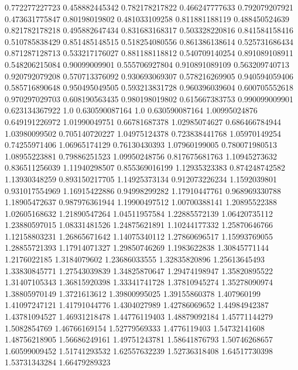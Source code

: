  0.772277227723   0.458882445342
 0.782178217822   0.466247777633
 0.792079207921   0.473631775847
  0.80198019802   0.481033109258
 0.811881188119   0.488450524639
 0.821782178218   0.495882647434
 0.831683168317   0.503328220816
 0.841584158416   0.510785838429
 0.851485148515   0.518254080556
 0.861386138614   0.525731686434
 0.871287128713   0.533217176027
 0.881188118812   0.540709140254
 0.891089108911   0.548206215084
  0.90099009901   0.555706927804
 0.910891089109   0.563209740713
 0.920792079208   0.570713376092
 0.930693069307   0.578216269905
 0.940594059406   0.585716890648
 0.950495049505   0.593213831728
 0.960396039604   0.600705552618
 0.970297029703   0.608190563435
 0.980198019802   0.615667383753
 0.990099009901   0.623134367922
            1.0   0.630590087164
            1.0   0.630590087164
  1.00995024876   0.649191226972
  1.01990049751    0.66781687378
  1.02985074627   0.686466784944
  1.03980099502   0.705140720227
  1.04975124378   0.723838441768
  1.05970149254    0.74255971406
  1.06965174129    0.76130430393
  1.07960199005   0.780071980513
  1.08955223881    0.79886251523
  1.09950248756   0.817675681763
  1.10945273632   0.836511256039
  1.11940298507   0.855369016199
  1.12935323383   0.874248742582
  1.13930348259   0.893150217705
  1.14925373134   0.912073226234
   1.1592039801   0.931017554969
  1.16915422886    0.94998299282
  1.17910447761   0.968969330788
  1.18905472637   0.987976361944
  1.19900497512    1.00700388141
  1.20895522388    1.02605168632
  1.21890547264    1.04511957584
  1.22885572139    1.06420735112
  1.23880597015    1.08331481526
  1.24875621891    1.10244177332
  1.25870646766    1.12158803231
  1.26865671642    1.14075340112
  1.27860696517    1.15993769055
  1.28855721393    1.17914071327
  1.29850746269     1.1983622838
  1.30845771144     1.2176022185
   1.3184079602    1.23686033555
  1.32835820896    1.25613645493
  1.33830845771    1.27543039839
  1.34825870647    1.29474198947
  1.35820895522    1.31407105343
  1.36815920398    1.33341741728
  1.37810945274    1.35278090974
  1.38805970149     1.3721613612
  1.39800995025    1.39155860378
    1.407960199    1.41097247121
  1.41791044776     1.4304027989
  1.42786069652    1.44984942387
  1.43781094527    1.46931218478
  1.44776119403    1.48879092184
  1.45771144279     1.5082854769
  1.46766169154    1.52779569333
   1.4776119403    1.54732141608
  1.48756218905    1.56686249161
  1.49751243781    1.58641876793
  1.50746268657    1.60599009452
  1.51741293532    1.62557632239
  1.52736318408    1.64517730398
  1.53731343284    1.66479289323
